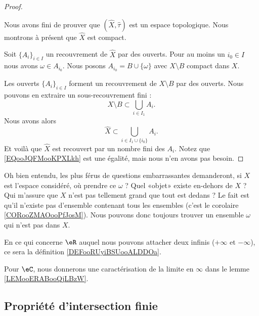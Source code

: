\begin{proof}
\begin{subproof}
	\end{subproof}
	Nous avons fini de prouver que \( (\hat X, \hat \tau)\) est un espace topologique. Nous montrons à présent que \( \hat X\) est compact.

	Soit \( \{ A_i \}_{i\in I}\) un recouvrement de \( \hat X\) par des ouverts. Pour au moins un \( i_0\in I\) nous avons \( \omega\in A_{i_0}\). Nous posons \( A_{i_0}=B\cup\{ \omega \}\) avec \( X\setminus B\) compact dans \( X\).

	Les ouverts \( \{ A_i \}_{i\in I}\) forment un recouvrement de \( X\setminus B\) par des ouverts. Nous pouvons en extraire un sous-recouvrement fini :
	\begin{equation}
		X\setminus B\subset \bigcup_{i\in I_1}A_i.
	\end{equation}
	Nous avons alors
	\begin{equation}        \label{EQooJQFMooKPXLkh}
		\hat X\subset \bigcup_{i\in I_1\cup\{ i_0 \}}A_i.
	\end{equation}
	Et voilà que \( \hat X\) est recouvert par un nombre fini des \( A_i\). Notez que \eqref{EQooJQFMooKPXLkh} est une égalité, mais nous n'en avons pas besoin.
\end{proof}

\begin{normaltext}
	Oh bien entendu, les plus férus de questions embarrassantes demanderont, si \( X\) est l'espace considéré, où prendre ce \( \omega\) ? Quel «objet» existe en-dehors de \( X\) ? Qui m'assure que \( X\) n'est pas tellement grand que tout est dedans ? Le fait est qu'il n'existe pas d'ensemble contenant tous les ensembles (c'est le corolaire \ref{CORooZMAOooPfJosM}). Nous pouvons donc toujours trouver un ensemble \( \omega\) qui n'est pas dans \( X\).
\end{normaltext}

En ce qui concerne \( \eR\) auquel nous pouvons attacher deux infinis (\( +\infty\) et \( -\infty\)), ce sera la définition \ref{DEFooRUyiBSUooALDDOa}.

Pour \( \eC\), nous donnerons une caractérisation de la limite en \( \infty\) dans le lemme \ref{LEMooERABooQjLBzW}.


\subsection{Propriété d'intersection finie}


